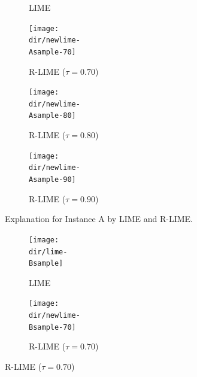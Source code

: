 \documentclass[11pt]{article}
\begin{document}
{{\begin{figure}[p]
\begin{subfigure}[t]{\imgwidth}
          \caption{LIME}\label{fig:A-lime}
        \end{subfigure}
        \begin{subfigure}[t]{\imgwidth}
          \hspace{0.5em}
          \texttt{[image: \\dir/newlime-\\Asample-70]}
          \caption{R-LIME ($\tau=0.70$)}\label{fig:A-rlime-70}
        \end{subfigure}
        \begin{subfigure}[t]{\imgwidth}
          \texttt{[image: \\dir/newlime-\\Asample-80]}
          \caption{R-LIME ($\tau=0.80$)}\label{fig:A-rlime-80}
        \end{subfigure}
        \begin{subfigure}[t]{\imgwidth}
          \hspace{-0.5em}
          \texttt{[image: \\dir/newlime-\\Asample-90]}
          \caption{R-LIME ($\tau=0.90$)}\label{fig:A-rlime-90}
        \end{subfigure}
        \caption[Explanation for Instance A by LIME and R-LIME]{%
          Explanation for Instance A by LIME and R-LIME.
        }\label{fig:A}
      \end{figure}
      \begin{figure}[p]
        \centering
        \begin{subfigure}[t]{\imgwidth}
          \hspace{-0.7em}
          \texttt{[image: \\dir/lime-\\Bsample]}
          \caption{LIME}\label{fig:B-lime}
        \end{subfigure}
        \begin{subfigure}[t]{\imgwidth}
          \hspace{0.5em}
          \texttt{[image: \\dir/newlime-\\Bsample-70]}
          \caption{R-LIME ($\tau=0.70$)}\label{fig:B-rlime-70}

\end{subfigure}
\end{figure}}}
\end{document}
